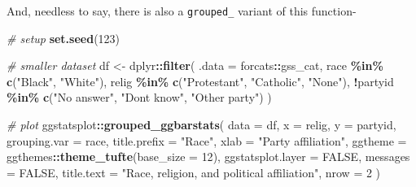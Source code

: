\documentclass[
]{article}
\newenvironment{Shaded}{\begin{snugshade}}{\end{snugshade}}
\newcommand{\CommentTok}[1]{\textcolor[rgb]{0.56,0.35,0.01}{\textit{#1}}}
\newcommand{\DataTypeTok}[1]{\textcolor[rgb]{0.13,0.29,0.53}{#1}}
\newcommand{\DecValTok}[1]{\textcolor[rgb]{0.00,0.00,0.81}{#1}}
\newcommand{\KeywordTok}[1]{\textcolor[rgb]{0.13,0.29,0.53}{\textbf{#1}}}
\newcommand{\NormalTok}[1]{#1}
\newcommand{\OperatorTok}[1]{\textcolor[rgb]{0.81,0.36,0.00}{\textbf{#1}}}
\newcommand{\OtherTok}[1]{\textcolor[rgb]{0.56,0.35,0.01}{#1}}
\newcommand{\StringTok}[1]{\textcolor[rgb]{0.31,0.60,0.02}{#1}}
\begin{document}
And, needless to say, there is also a \texttt{grouped\_} variant of this function-

\begin{Shaded}
\begin{Highlighting}[]
\CommentTok{\# setup}
\KeywordTok{set.seed}\NormalTok{(}\DecValTok{123}\NormalTok{)}

\CommentTok{\# smaller dataset}
\NormalTok{df <{-}}\StringTok{ }\NormalTok{dplyr}\OperatorTok{::}\KeywordTok{filter}\NormalTok{(}
  \DataTypeTok{.data =}\NormalTok{ forcats}\OperatorTok{::}\NormalTok{gss\_cat,}
\NormalTok{  race }\OperatorTok{\%in\%}\StringTok{ }\KeywordTok{c}\NormalTok{(}\StringTok{"Black"}\NormalTok{, }\StringTok{"White"}\NormalTok{),}
\NormalTok{  relig }\OperatorTok{\%in\%}\StringTok{ }\KeywordTok{c}\NormalTok{(}\StringTok{"Protestant"}\NormalTok{, }\StringTok{"Catholic"}\NormalTok{, }\StringTok{"None"}\NormalTok{),}
  \OperatorTok{!}\NormalTok{partyid }\OperatorTok{\%in\%}\StringTok{ }\KeywordTok{c}\NormalTok{(}\StringTok{"No answer"}\NormalTok{, }\StringTok{"Don\textquotesingle{}t know"}\NormalTok{, }\StringTok{"Other party"}\NormalTok{)}
\NormalTok{)}

\CommentTok{\# plot}
\NormalTok{ggstatsplot}\OperatorTok{::}\KeywordTok{grouped\_ggbarstats}\NormalTok{(}
  \DataTypeTok{data =}\NormalTok{ df,}
  \DataTypeTok{x =}\NormalTok{ relig,}
  \DataTypeTok{y =}\NormalTok{ partyid,}
  \DataTypeTok{grouping.var =}\NormalTok{ race,}
  \DataTypeTok{title.prefix =} \StringTok{"Race"}\NormalTok{,}
  \DataTypeTok{xlab =} \StringTok{"Party affiliation"}\NormalTok{,}
  \DataTypeTok{ggtheme =}\NormalTok{ ggthemes}\OperatorTok{::}\KeywordTok{theme\_tufte}\NormalTok{(}\DataTypeTok{base\_size =} \DecValTok{12}\NormalTok{),}
  \DataTypeTok{ggstatsplot.layer =} \OtherTok{FALSE}\NormalTok{,}
  \DataTypeTok{messages =} \OtherTok{FALSE}\NormalTok{,}
  \DataTypeTok{title.text =} \StringTok{"Race, religion, and political affiliation"}\NormalTok{,}
  \DataTypeTok{nrow =} \DecValTok{2}
\NormalTok{)}
\end{Highlighting}
\end{Shaded}
\end{document}
